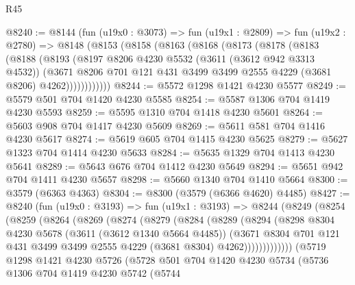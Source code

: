 \begin{lexlean}{R45}
\begin{coremodule}
@8240 := @8144
    (fun (u19x0 : @3073) =>
    fun (u19x1 : @2809) =>
    fun (u19x2 : @2780) =>
    @8148
      (@8153
        (@8158
          (@8163
            (@8168
              (@8173
                (@8178
                  (@8183
                    (@8188
                      (@8193
                        (@8197
                          @8206
                          @4230
                          @5532
                          (@3611 (@3612 @942 @3313 @4532))
                          (@3671
                            @8206
                            @701
                            @121
                            @431
                            @3499
                            @3499
                            @2555
                            @4229
                            (@3681 @8206)
                            @4262))))))))))))
@8244 := @5572 @1298 @1421 @4230 @5577
@8249 := @5579 @501 @704 @1420 @4230 @5585
@8254 := @5587 @1306 @704 @1419 @4230 @5593
@8259 := @5595 @1310 @704 @1418 @4230 @5601
@8264 := @5603 @908 @704 @1417 @4230 @5609
@8269 := @5611 @581 @704 @1416 @4230 @5617
@8274 := @5619 @605 @704 @1415 @4230 @5625
@8279 := @5627 @1323 @704 @1414 @4230 @5633
@8284 := @5635 @1329 @704 @1413 @4230 @5641
@8289 := @5643 @676 @704 @1412 @4230 @5649
@8294 := @5651 @942 @704 @1411 @4230 @5657
@8298 := @5660 @1340 @704 @1410 @5664
@8300 := @3579 (@6363 @4363)
@8304 := @8300 (@3579 (@6366 @4620) @4485)
@8427 := @8240
    (fun (u19x0 : @3193) =>
    fun (u19x1 : @3193) =>
    @8244
      (@8249
        (@8254
          (@8259
            (@8264
              (@8269
                (@8274
                  (@8279
                    (@8284
                      (@8289
                        (@8294
                          (@8298
                            @8304
                            @4230
                            @5678
                            (@3611 (@3612 @1340 @5664 @4485))
                            (@3671
                              @8304
                              @701
                              @121
                              @431
                              @3499
                              @3499
                              @2555
                              @4229
                              (@3681 @8304)
                              @4262)))))))))))))
    (@5719
      @1298
      @1421
      @4230
      @5726
      (@5728
        @501
        @704
        @1420
        @4230
        @5734
        (@5736
          @1306
          @704
          @1419
          @4230
          @5742
          (@5744

\end{coremodule}
\end{lexlean}
